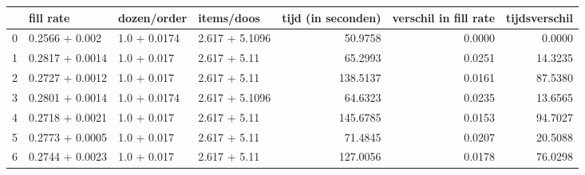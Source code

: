 \begin{tabular}{llllrrr}
\toprule
{} &        fill rate &   dozen/order &      items/doos &  tijd (in seconden) &  verschil in fill rate &  tijdsverschil \\
\midrule
0 &   0.2566 + 0.002 &  1.0 + 0.0174 &  2.617 + 5.1096 &             50.9758 &                 0.0000 &         0.0000 \\
1 &  0.2817 + 0.0014 &   1.0 + 0.017 &    2.617 + 5.11 &             65.2993 &                 0.0251 &        14.3235 \\
2 &  0.2727 + 0.0012 &   1.0 + 0.017 &    2.617 + 5.11 &            138.5137 &                 0.0161 &        87.5380 \\
3 &  0.2801 + 0.0014 &  1.0 + 0.0174 &  2.617 + 5.1096 &             64.6323 &                 0.0235 &        13.6565 \\
4 &  0.2718 + 0.0021 &   1.0 + 0.017 &    2.617 + 5.11 &            145.6785 &                 0.0153 &        94.7027 \\
5 &  0.2773 + 0.0005 &   1.0 + 0.017 &    2.617 + 5.11 &             71.4845 &                 0.0207 &        20.5088 \\
6 &  0.2744 + 0.0023 &   1.0 + 0.017 &    2.617 + 5.11 &            127.0056 &                 0.0178 &        76.0298 \\
\bottomrule
\end{tabular}
